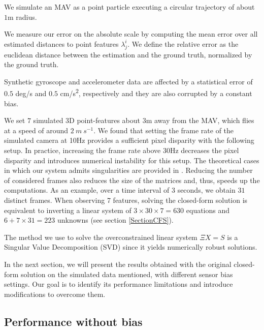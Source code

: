 \documentclass[letterpaper, 10 pt, conference]{ieeeconf}  %
\begin{document}
We simulate an MAV as a point particle executing a circular trajectory of about $1$m radius.

We measure our error on the absolute scale by computing the mean error over all estimated distances to point features $\lambda_j^i$.
We define the relative error as the euclidean distance between the estimation and the ground truth,
normalized by the ground truth.

Synthetic gyroscope and accelerometer data are affected by a statistical error of $0.5$ deg/s and $0.5$ cm/s\textsuperscript{2}, respectively and they are also corrupted by a constant bias.

We set $7$ simulated 3D point-features about $3$m away from the MAV, which flies at a speed of around $2~m~s^{-1}$.
We found that setting the frame rate of the simulated camera at 10Hz provides a sufficient pixel disparity with the following setup.
In practice, increasing the frame rate above 30Hz decreases the pixel disparity and introduces numerical instability for this setup.
The theoretical cases in which our system admits singularities are provided in \cite{Martinelli2012, Martinelli2014}.
Reducing the number of considered frames also reduces the size of the matrices and, thus, speeds up the computations.
As an example, over a time interval of 3 seconds, we obtain $31$ distinct frames.
When observing 7 features, solving the closed-form solution is equivalent to inverting a linear system of $3\times 30\times 7 = 630$ equations and $6+7\times 31=223$ unknowns (see section \ref{SectionCFS}).

The method we use to solve the overconstrained linear system $\Xi X = S$ is a Singular Value Decomposition (SVD) since it yields numerically robust solutions.

In the next section, we will present the results obtained with the original closed-form solution on the simulated data mentioned, with different sensor bias settings.
Our goal is to identify its performance limitations and introduce modifications to overcome them.



\subsection{Performance without bias}
\end{document}
